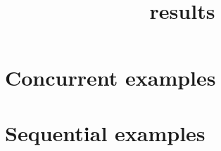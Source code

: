 \documentclass[10pt]{article}
\begin{document}
\title{\Leap results}




\maketitle

\section{Concurrent examples}

\ResultsConcurrentInfo

\vspace{3em}

\ResultsConcurrentTimes

\section{Sequential examples}

\ResultsSequentialInfo

\vspace{3em}

\ResultsSequentialTimes
\end{document}
